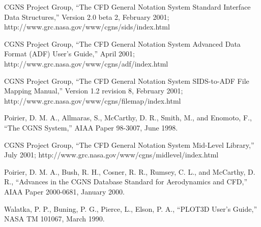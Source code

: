\documentclass[12pt]{article}
\begin{document}
\begin{thebibliography}{99}

CGNS Project Group,
``The CFD General Notation System Standard Interface Data Structures,''
Version 2.0 beta 2, February 2001;
http://www.grc.nasa.gov/www/cgns/sids/index.html

CGNS Project Group,
``The CFD General Notation System Advanced Data Format (ADF) User's Guide,''
April 2001;
http://www.grc.nasa.gov/www/cgns/adf/index.html

CGNS Project Group,
``The CFD General Notation System SIDS-to-ADF File Mapping Manual,''
Version 1.2 revision 8, February 2001;
http://www.grc.nasa.gov/www/cgns/filemap/index.html

Poirier, D. M. A., Allmaras, S., McCarthy, D. R., Smith, M., and
Enomoto, F.,
``The CGNS System,''
AIAA Paper 98-3007, June 1998.

CGNS Project Group,
``The CFD General Notation System Mid-Level Library,''
July 2001;
http://www.grc.nasa.gov/www/cgns/midlevel/index.html

Poirier, D. M. A., Bush, R. H., Cosner, R. R., Rumsey, C. L., and
McCarthy, D. R.,
``Advances in the CGNS Database Standard for Aerodynamics and CFD,''
AIAA Paper 2000-0681, January 2000.

Walatka, P. P., Buning, P. G., Pierce, L., Elson, P. A.,
``PLOT3D User's Guide,''
NASA TM 101067, March 1990.

\end{thebibliography}
%
\end{document}
